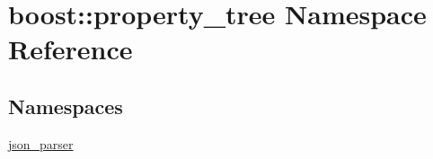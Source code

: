 \hypertarget{namespaceboost_1_1property__tree}{\section{boost\-:\-:property\-\_\-tree Namespace Reference}
\label{namespaceboost_1_1property__tree}
}
\subsection*{Namespaces}
\begin{DoxyCompactItemize}
\item 
\hyperlink{namespaceboost_1_1property__tree_1_1json__parser}{json\-\_\-parser}
\end{DoxyCompactItemize}
